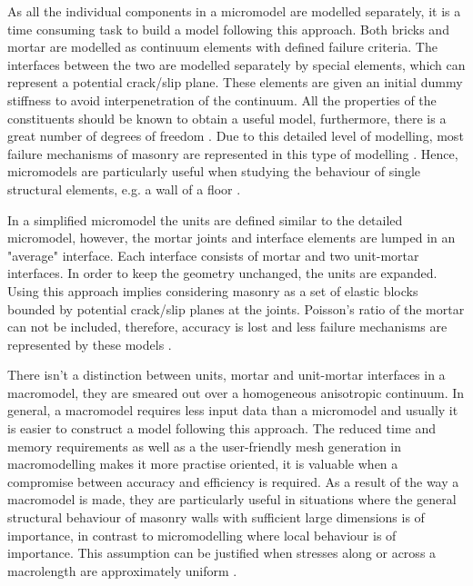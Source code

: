 As all the individual components in a micromodel are modelled separately, it is a time consuming task to build a model following this approach. Both bricks and mortar are modelled as continuum elements with defined failure criteria. The interfaces between the two are modelled separately by special elements, which can represent a potential crack/slip plane. These elements are given an initial dummy stiffness to avoid interpenetration of the continuum. All the properties of the constituents should be known to obtain a useful model, furthermore, there is a great number of degrees of freedom \cite{Mersch2015}. Due to this detailed level of modelling, most failure mechanisms of masonry are represented in this type of modelling \cite{barraza2012numerical}. Hence, micromodels are particularly useful when studying the behaviour of single structural elements, e.g. a wall of a floor \cite{Mersch2015}.

In a simplified micromodel the units are defined similar to the detailed micromodel, however, the mortar joints and interface elements are lumped in an "average" interface. Each interface consists of mortar and two unit-mortar interfaces. In order to keep the geometry unchanged, the units are expanded. Using this approach implies considering masonry as a set of elastic blocks bounded by potential crack/slip planes at the joints. Poisson's ratio of the mortar can not be included, therefore, accuracy is lost and less failure mechanisms are represented by these models \cite{lourenco1996}.

There isn't a distinction between units, mortar and unit-mortar interfaces in a macromodel, they are smeared out over a homogeneous anisotropic continuum. In general, a macromodel requires less input data than a micromodel and usually it is easier to construct a model following this approach. The reduced time and memory requirements as well as a the user-friendly mesh generation in macromodelling makes it more practise oriented, it is valuable when a compromise between accuracy and efficiency is required. As a result of the way a macromodel is made, they are particularly useful in situations where the general structural behaviour of masonry walls with sufficient large dimensions is of importance, in contrast to micromodelling where local behaviour is of importance. This assumption can be justified when stresses along or across a macrolength are approximately uniform \cite{lourenco1996}.  
\cite{massart2003}
